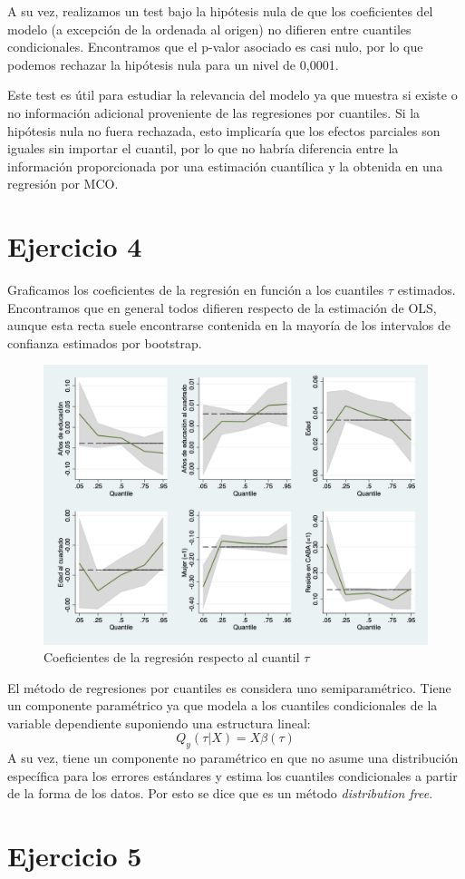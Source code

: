 \documentclass[12pt]{article}
\begin{document}
A su vez, realizamos un test bajo la hipótesis nula de que los coeficientes del modelo (a excepción de la ordenada al origen) no difieren entre cuantiles condicionales. Encontramos que el p-valor asociado es casi nulo, por lo que podemos rechazar la hipótesis nula para un nivel de 0,0001. 

Este test es útil para estudiar la relevancia del modelo ya que muestra si existe o no información adicional proveniente de las regresiones por cuantiles. Si la hipótesis nula no fuera rechazada, esto implicaría que los efectos parciales son iguales sin importar el cuantil, por lo que no habría diferencia entre la información proporcionada por una estimación cuantílica y la obtenida en una regresión por MCO.

\section*{Ejercicio 4}

Graficamos los coeficientes de la regresión en función a los cuantiles $\tau$ estimados. Encontramos que en general todos difieren respecto de la estimación de OLS, aunque esta recta suele encontrarse contenida en la mayoría de los intervalos de confianza estimados por bootstrap. 

\begin{figure}
	\caption{Coeficientes de la regresión respecto al cuantil $\tau$}
	\centering
	\includegraphics[width=0.8\linewidth]{4.png}
\end{figure}

El método de regresiones por cuantiles es considera uno semiparamétrico. Tiene un componente paramétrico ya que modela a los cuantiles condicionales de la variable dependiente suponiendo una estructura lineal:
\[
Q_y(\tau | X ) = X \beta(\tau)
\]
A su vez, tiene un componente no paramétrico en que no asume una distribución específica para los errores estándares y estima los cuantiles condicionales a partir de la forma de los datos. Por esto se dice que es un método \textit{distribution free}.

\section*{Ejercicio 5}
\end{document}
